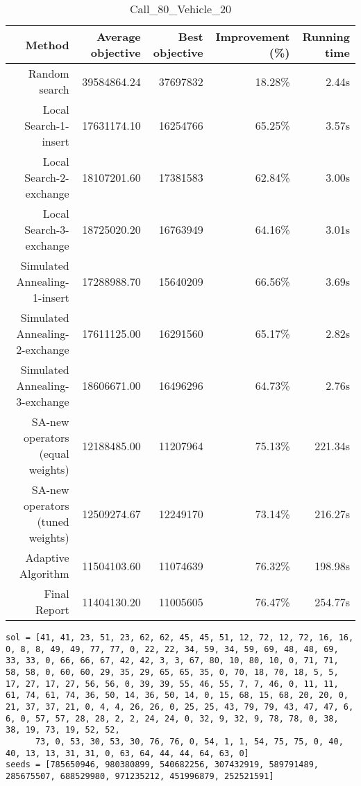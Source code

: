 \begin{table}[ht]
\centering
\caption{Call\_80\_Vehicle\_20}
\label{tab:call80vehicle20}
\begin{tabular}{|r|r|r|r|r|}
Method & Average objective & Best objective & Improvement (\%) & Running time \\
\hline
Random search & 39584864.24 & 37697832 & 18.28\% & 2.44s\\
Local Search-1-insert & 17631174.10 & 16254766 & 65.25\% & 3.57s\\
Local Search-2-exchange & 18107201.60 & 17381583 & 62.84\% & 3.00s\\
Local Search-3-exchange & 18725020.20 & 16763949 & 64.16\% & 3.01s\\
Simulated Annealing-1-insert & 17288988.70 & 15640209 & 66.56\% & 3.69s\\
Simulated Annealing-2-exchange & 17611125.00 & 16291560 & 65.17\% & 2.82s\\
Simulated Annealing-3-exchange & 18606671.00 & 16496296 & 64.73\% & 2.76s\\
SA-new operators (equal weights) & 12188485.00 & 11207964 & 75.13\% & 221.34s\\
SA-new operators (tuned weights) & 12509274.67 & 12249170 & 73.14\% & 216.27s\\
Adaptive Algorithm & 11504103.60 & 11074639 & 76.32\% & 198.98s\\
Final Report & 11404130.20 & 11005605 & 76.47\% & 254.77s\\
\end{tabular}%
\end{table}
\begin{lstlisting}[label={lst:call80vehicle20},caption=Optimal solution call\_80\_vehicle\_20]
sol = [41, 41, 23, 51, 23, 62, 62, 45, 45, 51, 12, 72, 12, 72, 16, 16, 0, 8, 8, 49, 49, 77, 77, 0, 22, 22, 34, 59, 34, 59, 69, 48, 48, 69, 33, 33, 0, 66, 66, 67, 42, 42, 3, 3, 67, 80, 10, 80, 10, 0, 71, 71, 58, 58, 0, 60, 60, 29, 35, 29, 65, 65, 35, 0, 70, 18, 70, 18, 5, 5, 17, 27, 17, 27, 56, 56, 0, 39, 39, 55, 46, 55, 7, 7, 46, 0, 11, 11, 61, 74, 61, 74, 36, 50, 14, 36, 50, 14, 0, 15, 68, 15, 68, 20, 20, 0, 21, 37, 37, 21, 0, 4, 4, 26, 26, 0, 25, 25, 43, 79, 79, 43, 47, 47, 6, 6, 0, 57, 57, 28, 28, 2, 2, 24, 24, 0, 32, 9, 32, 9, 78, 78, 0, 38, 38, 19, 73, 19, 52, 52,
      73, 0, 53, 30, 53, 30, 76, 76, 0, 54, 1, 1, 54, 75, 75, 0, 40, 40, 13, 13, 31, 31, 0, 63, 64, 44, 44, 64, 63, 0]
seeds = [785650946, 980380899, 540682256, 307432919, 589791489, 285675507, 688529980, 971235212, 451996879, 252521591]
\end{lstlisting}%
\clearpage


